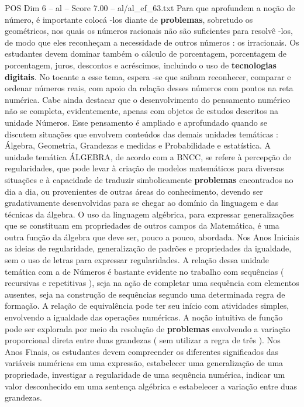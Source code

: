 \begin{textsample}{POS Dim 6 – al – Score 7.00 – al/al\_ef\_63.txt}
Para que aprofundem a noção de número, é importante colocá -los diante de \textbf{problemas}, sobretudo os geométricos, nos quais os números racionais não são suficientes para resolvê -los, de modo que eles reconheçam a necessidade de outros números : os irracionais.
Os estudantes devem dominar também o cálculo de porcentagem, porcentagem de porcentagem, juros, descontos e acréscimos, incluindo o uso de \textbf{tecnologias} \textbf{digitais}.
No tocante a esse tema, espera -se que saibam reconhecer, comparar e ordenar números reais, com apoio da relação desses números com pontos na reta numérica.
Cabe ainda destacar que o desenvolvimento do pensamento numérico não se completa, evidentemente, apenas com objetos de estudos descritos na unidade Números.
Esse pensamento é ampliado e aprofundado quando se discutem situações que envolvem conteúdos das demais unidades temáticas : Álgebra, Geometria, Grandezas e medidas e Probabilidade e estatística.
A unidade temática ÁLGEBRA, de acordo com a BNCC, se refere à percepção de regularidades, que pode levar à criação de modelos matemáticos para diversas situações e à capacidade de traduzir simbolicamente \textbf{problemas} encontrados no dia a dia, ou provenientes de outras áreas do conhecimento, devendo ser gradativamente desenvolvidas para se chegar ao domínio da linguagem e das técnicas da álgebra.
O uso da linguagem algébrica, para expressar generalizações que se constituam em propriedades de outros campos da Matemática, é uma outra função da álgebra que deve ser, pouco a pouco, abordada.
Nos Anos Iniciais as ideias de regularidade, generalização de padrões e propriedades da igualdade, sem o uso de letras para expressar regularidades.
A relação dessa unidade temática com a de Números é bastante evidente no trabalho com sequências ( recursivas e repetitivas ), seja na ação de completar uma sequência com elementos ausentes, seja na construção de sequências segundo uma determinada regra de formação.
A relação de equivalência pode ter seu início com atividades simples, envolvendo a igualdade das operações numéricas.
A noção intuitiva de função pode ser explorada por meio da resolução de \textbf{problemas} envolvendo a variação proporcional direta entre duas grandezas ( sem utilizar a regra de três ).
Nos Anos Finais, os estudantes devem compreender os diferentes significados das variáveis numéricas em uma expressão, estabelecer uma generalização de uma propriedade, investigar a regularidade de uma sequência numérica, indicar um valor desconhecido em uma sentença algébrica e estabelecer a variação entre duas grandezas.

\end{textsample}
